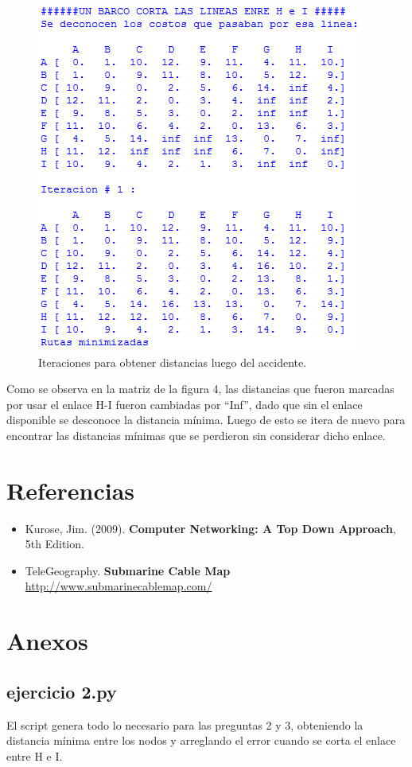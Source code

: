 \documentclass{article}
\begin{document}
\begin{figure}[H]
    \centering
    \includegraphics[scale=0.7]{post-barco}
    \caption{Iteraciones para obtener distancias luego del accidente.}
\end{figure}

Como se observa en la matriz de la figura 4, las distancias que fueron marcadas por usar el enlace H-I fueron cambiadas por ``Inf'', dado que sin el enlace disponible se desconoce la distancia mínima. Luego de esto se itera de nuevo para encontrar las distancias mínimas que se perdieron sin considerar dicho enlace.

    
\section{Referencias}
\begin{itemize}
\item Kurose, Jim. (2009). \textbf{Computer Networking: A Top Down Approach}, 5th Edition.
\item TeleGeography. \textbf{Submarine Cable Map} \url{http://www.submarinecablemap.com/}
\end{itemize}




\pagebreak
\section{Anexos}

\subsection{ejercicio 2.py}
El script genera todo lo necesario para las preguntas 2 y 3, obteniendo la distancia mínima entre los nodos y arreglando el error cuando se corta el enlace entre H e I.
\end{document}
